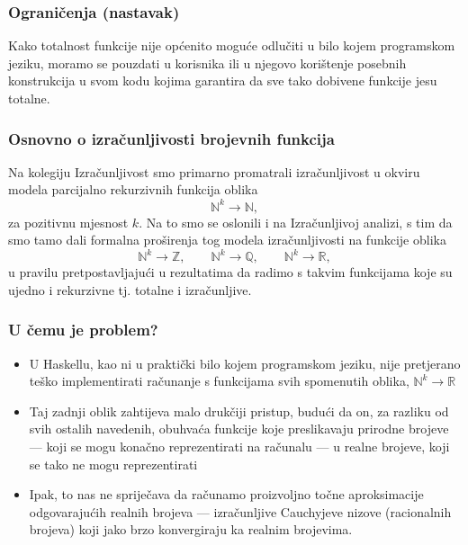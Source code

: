 \documentclass{beamer}
\def\N{\mathbb{N}}
\def\Z{\mathbb{Z}}
\def\Q{\mathbb{Q}}
\def\R{\mathbb{R}}
\begin{document}
\begin{frame}
    \frametitle{Ograničenja (nastavak)}
    Kako totalnost funkcije nije općenito moguće odlučiti u bilo
    kojem programskom jeziku, moramo se pouzdati u korisnika ili u njegovo
    korištenje posebnih konstrukcija u svom kodu kojima garantira da sve
    tako dobivene funkcije jesu totalne.    
\end{frame}

\begin{frame}
    \frametitle{Osnovno o izračunljivosti brojevnih funkcija}
    Na kolegiju Izračunljivost smo primarno promatrali izračunljivost
    u okviru modela parcijalno rekurzivnih funkcija oblika
    \begin{equation*}
        \N^k\to\N,
    \end{equation*}
    za pozitivnu mjesnost $k$. Na to smo se  oslonili i na
     Izračunljivoj analizi, s tim da smo tamo dali formalna proširenja
     tog modela izračunljivosti na funkcije oblika
     \begin{equation*}
        \N^k\to\Z,\qquad \N^k\to\Q,\qquad \N^k\to\R,
     \end{equation*}
    u pravilu pretpostavljajući u rezultatima da radimo s takvim
    funkcijama koje su ujedno i rekurzivne tj. totalne i izračunljive. 
\end{frame}

\begin{frame}
    \frametitle{U čemu je problem?}
    \begin{itemize}
        \item U Haskellu, kao ni u praktički bilo kojem programskom jeziku,
        nije pretjerano teško implementirati računanje s funkcijama
        svih spomenutih oblika, $\N^k\to\R$
\item 
    Taj zadnji oblik
     zahtijeva malo drukčiji pristup, budući da on, za razliku od
     svih ostalih navedenih, obuhvaća funkcije koje preslikavaju
     prirodne brojeve --- koji se mogu konačno reprezentirati na
     računalu --- u realne brojeve, koji se tako ne mogu reprezentirati
\item Ipak, to nas ne spriječava da računamo \alert{proizvoljno točne
aproksimacije} odgovarajućih realnih brojeva --- izračunljive
Cauchyjeve nizove
(racionalnih brojeva) koji jako brzo konvergiraju ka realnim brojevima.
    \end{itemize}
\end{frame}
\end{document}
